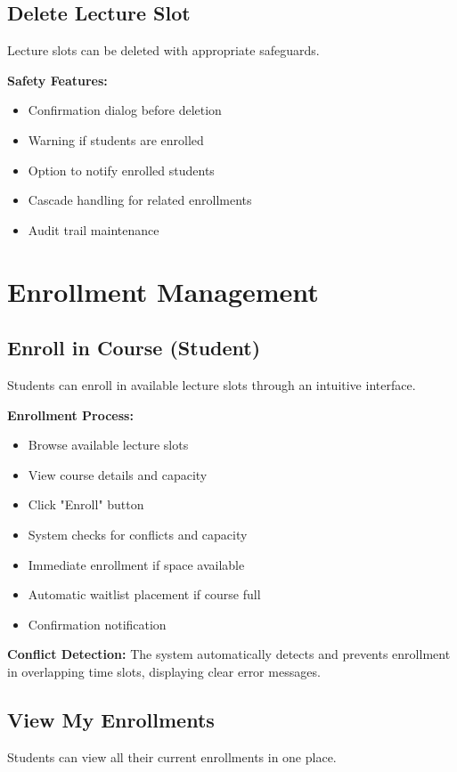 \subsection{Delete Lecture Slot}
Lecture slots can be deleted with appropriate safeguards.

\textbf{Safety Features:}
\begin{itemize}
    \item Confirmation dialog before deletion
    \item Warning if students are enrolled
    \item Option to notify enrolled students
    \item Cascade handling for related enrollments
    \item Audit trail maintenance
\end{itemize}

\section{Enrollment Management}

\subsection{Enroll in Course (Student)}
Students can enroll in available lecture slots through an intuitive interface.

\textbf{Enrollment Process:}
\begin{itemize}
    \item Browse available lecture slots
    \item View course details and capacity
    \item Click "Enroll" button
    \item System checks for conflicts and capacity
    \item Immediate enrollment if space available
    \item Automatic waitlist placement if course full
    \item Confirmation notification
\end{itemize}

\textbf{Conflict Detection:} The system automatically detects and prevents enrollment in overlapping time slots, displaying clear error messages.

\subsection{View My Enrollments}
Students can view all their current enrollments in one place.

